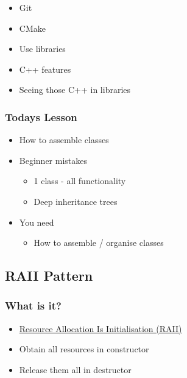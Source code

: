\begin{itemize}
\itemsep1pt\parskip0pt
\item
  Git
\item
  CMake
\item
  Use libraries
\item
  C++ features
\item
  Seeing those C++ in libraries
\end{itemize}

\subsubsection{Todays Lesson}\label{todays-lesson-1}

\begin{itemize}
\itemsep1pt\parskip0pt
\item
  How to assemble classes
\item
  Beginner mistakes

  \begin{itemize}
  \itemsep1pt\parskip0pt
  \item
    1 class - all functionality
  \item
    Deep inheritance trees
  \end{itemize}
\item
  You need

  \begin{itemize}
  \itemsep1pt\parskip0pt
  \item
    How to assemble / organise classes
  \end{itemize}
\end{itemize}

\subsection{RAII Pattern}\label{raii-pattern}

\subsubsection{What is it?}\label{what-is-it}

\begin{itemize}
\itemsep1pt\parskip0pt
\item
  \href{https://en.wikipedia.org/wiki/Resource_Acquisition_Is_Initialization}{Resource
  Allocation Is Initialisation (RAII)}
\item
  Obtain all resources in constructor
\item
  Release them all in destructor
\end{itemize}

